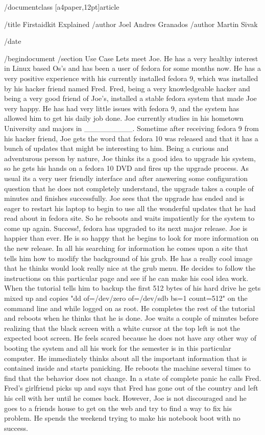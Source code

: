 /documentclass [a4paper,12pt]{article}

/title{ Firstaidkit Explained }
/author{ Joel Andres Granados}
/author{ Martin Sivak }

/date {}

/begin{document}
/section{ Use Case }
Lets meet Joe.  He has a very healthy interest in Linux based Os's and has been a user of fedora for some months now.  He has a very positive experience with his currently installed fedora 9, which was installed by his hacker friend named Fred.  Fred, being a very knowledgeable hacker and being a very good friend of Joe's, installed a stable fedora system that made Joe very happy.  He has had very little issues with fedora 9, and the system has allowed him to get his daily job done.  Joe currently studies in his hometown University and majors in _________.
Sometime after receiving fedora 9 from his hacker friend, Joe gets the word that fedora 10 was released and that it has a bunch of updates that might be interesting to him.  Being a curious and adventurous person by nature, Joe thinks its a good idea to upgrade his system, so he gets his hands on a fedora 10 DVD and fires up the upgrade process.  As usual its a very user friendly interface and after answering some configuration question that he does not completely understand, the upgrade takes a couple of minutes and finishes successfully.  Joe sees that the upgrade has ended and is eager to restart his laptop to begin to use all the wonderful updates that he had read about in fedora site.  So he reboots and waits impatiently for the system to come up again.
Success!, fedora has upgraded to its next major release.  Joe is happier than ever.  He is so happy that he begins to look for more information on the new release.  In all his searching for information he comes upon a site that tells him how to modify the background of his grub.  He has a really cool image that he thinks would look really nice at the grub menu.  He decides to follow the instructions on this particular page and see if he can make his cool idea work.  When the tutorial tells him to backup the first 512 bytes of his hard drive he gets mixed up and copies "dd of=/dev/zero of=/dev/sdb bs=1 count=512" on the command line and while logged on as root.  He completes the rest of the tutorial and reboots when he thinks that he is done.
Joe waits a couple of minutes before realizing that the black screen with a white cursor at the top left is not the expected boot screen.  He feels scared because he does not have any other way of booting the system and all his work for the semester is in this particular computer.  He immediately thinks about all the important information that is contained inside and starts panicking.  He reboots the machine several times to find that the behavior does not change.  In a state of complete panic he calls Fred.  Fred's girlfriend picks up and says that Fred has gone out of the country and left his cell with her until he comes back.  However, Joe is not discouraged and he goes to a friends house to get on the web and try to find a way to fix his problem.  He spends the weekend trying to make his notebook boot with no success.
